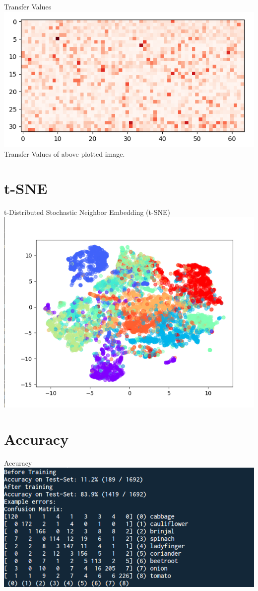 \documentclass[10pt, a4paper,xcolor=table]{beamer}
\begin{document}
\begin{frame}{Transfer Values}
	\includegraphics[scale=0.5]{onion2transfer.png} \\
	\centering
	Transfer Values of above plotted image.
\end{frame}

\section{t-SNE}
\begin{frame}{t-Distributed Stochastic Neighbor Embedding (t-SNE)}
	\includegraphics[scale=0.45]{TSNE.png}
\end{frame}

\section{Accuracy}
\begin{frame}{Accuracy}
	\includegraphics[scale=0.7]{confmatrix.png}
\end{frame}
\end{document}
